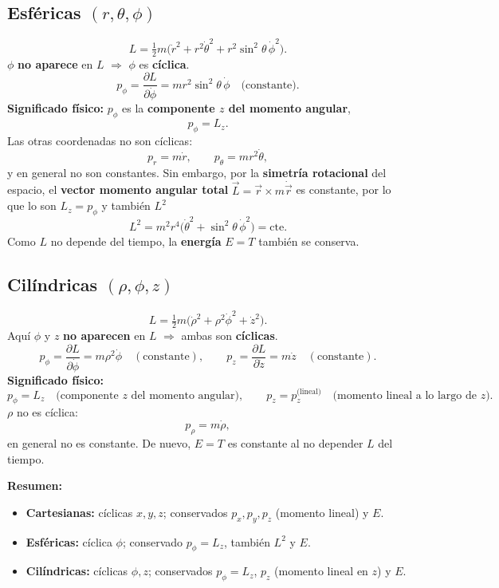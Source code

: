 \documentclass{article}
\begin{document}
\subsection*{Esféricas \((r,\theta,\phi)\)}
\[
L=\tfrac12 m\Big(\dot r^2+r^2\dot\theta^2+r^2\sin^2\theta\,\dot\phi^2\Big).
\]
\(\phi\) \textbf{no aparece} en \(L\) \(\Rightarrow\) \(\phi\) es \textbf{cíclica}.
\[
p_\phi=\frac{\partial L}{\partial \dot\phi}=m r^2\sin^2\theta\,\dot\phi
\quad\text{(constante)}.
\]
\textbf{Significado físico:} \(p_\phi\) es la \textbf{componente \(z\) del momento angular},
\[
p_\phi=L_z.
\]
Las otras coordenadas no son cíclicas:
\[
p_r=m\dot r,\qquad p_\theta=m r^2\dot\theta,
\]
y en general no son constantes. Sin embargo, por la \textbf{simetría rotacional} del espacio,
el \textbf{vector momento angular total} \(\vec L=\vec r\times m\dot{\vec r}\) es constante,
por lo que lo son \(L_z=p_\phi\) y también \(L^2\)
\[
L^2=m^2 r^4\Big(\dot\theta^2+\sin^2\theta\,\dot\phi^2\Big)=\text{cte}.
\]
Como \(L\) no depende del tiempo, la \textbf{energía} \(E=T\) también se conserva.

\subsection*{Cilíndricas \((\rho,\phi,z)\)}
\[
L=\tfrac12 m\Big(\dot\rho^2+\rho^2\dot\phi^2+\dot z^2\Big).
\]
Aquí \(\phi\) y \(z\) \textbf{no aparecen} en \(L\) \(\Rightarrow\) ambas son \textbf{cíclicas}.
\[
p_\phi=\frac{\partial L}{\partial \dot\phi}=m\rho^2\dot\phi
\quad(\text{constante}),\qquad
p_z=\frac{\partial L}{\partial \dot z}=m\dot z
\quad(\text{constante}).
\]
\textbf{Significado físico:}
\[
p_\phi=L_z \quad\text{(componente \(z\) del momento angular)},\qquad
p_z=p_z^{\text{(lineal)}} \quad\text{(momento lineal a lo largo de \(z\))}.
\]
\(\rho\) no es cíclica:
\[
p_\rho=m\dot\rho,
\]
en general no es constante. De nuevo, \(E=T\) es constante al no depender \(L\) del tiempo.

\bigskip
\noindent\textbf{Resumen:}
\begin{itemize}
  \item \textbf{Cartesianas:} cíclicas \(x,y,z\);\; conservados \(p_x,p_y,p_z\) (momento lineal) y \(E\).
  \item \textbf{Esféricas:} cíclica \(\phi\);\; conservado \(p_\phi=L_z\), también \(L^2\) y \(E\).
  \item \textbf{Cilíndricas:} cíclicas \(\phi,z\);\; conservados \(p_\phi=L_z\), \(p_z\) (momento lineal en \(z\)) y \(E\).
\end{itemize} 
\end{document}
